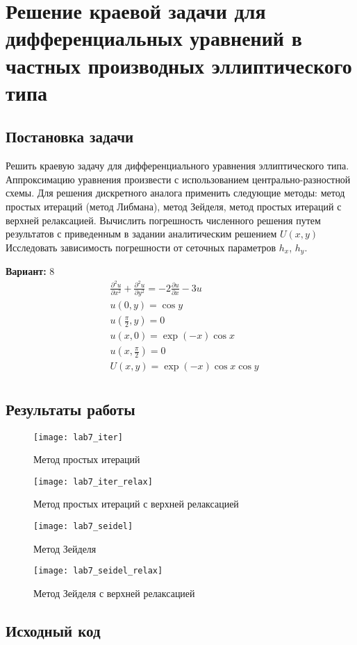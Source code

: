 \section{Решение краевой задачи для дифференциальных уравнений в частных производных эллиптического типа}

\subsection{Постановка задачи}
Решить краевую задачу для дифференциального уравнения эллиптического типа. Аппроксимацию уравнения произвести с использованием центрально-разностной схемы. Для решения дискретного аналога применить следующие методы: метод простых итераций (метод Либмана), метод Зейделя, метод простых итераций с верхней релаксацией. Вычислить погрешность численного решения путем результатов с приведенным в задании аналитическим решением $U(x, y)$ Исследовать зависимость погрешности от сеточных параметров $h_x$, $h_y$.

{\bfseries Вариант:} 8
\begin{align*} 
& \frac{\partial^2 u}{\partial x^2} + \frac{\partial^2 u}{\partial y^2} = -2 \frac{\partial u}{\partial x} - 3 u \\
& u(0, y) = \cos y \\
& u(\frac{\pi}{2}, y) = 0 \\
& u(x, 0) = \exp(-x) \cos x \\
& u(x, \frac{\pi}{2}) = 0 \\
& U(x, y) = \exp(-x) \cos x \cos y \\
\end{align*}
\pagebreak

\subsection{Результаты работы}
\begin{figure}[h!]
\centering
\texttt{[image: lab7\_iter]}
\caption{Метод простых итераций}
\end{figure}

\vfill

\begin{figure}[h!]
\centering
\texttt{[image: lab7\_iter\_relax]}
\caption{Метод простых итераций с верхней релаксацией}
\end{figure}

\pagebreak

\begin{figure}[h!]
\centering
\texttt{[image: lab7\_seidel]}
\caption{Метод Зейделя}
\end{figure}

\vfill

\begin{figure}[h!]
\centering
\texttt{[image: lab7\_seidel\_relax]}
\caption{Метод Зейделя с верхней релаксацией}
\end{figure}
\pagebreak

\subsection{Исходный код}

\pagebreak
